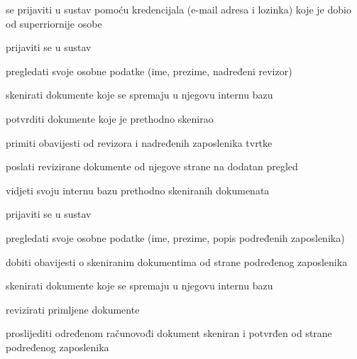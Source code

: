 			
			\begin{packed_enum}
				
				\item  {}
				\begin{packed_enum}
					
					\item se prijaviti u sustav pomoću kredencijala (e-mail adresa i lozinka) koje je dobio od superriornije osobe 
					
				\end{packed_enum}
			
				\item  {}
				\begin{packed_enum}
					
					\item prijaviti se u sustav
					\item pregledati svoje osobne podatke (ime, prezime, nadređeni revizor)
					\item skenirati dokumente koje se spremaju u njegovu internu bazu
					\item potvrditi dokumente koje je prethodno skenirao
					\item primiti obavijesti od revizora i nadređenih zaposlenika tvrtke
					\item poslati revizirane dokumente od njegove strane na dodatan pregled
					\item vidjeti svoju internu bazu prethodno skeniranih dokumenata
					
				\end{packed_enum}
				
				\item  {}
				\begin{packed_enum}
					
					\item prijaviti se u sustav
					\item pregledati svoje osobne podatke (ime, prezime, popis podređenih zaposlenika)
					\item dobiti obavijesti o skeniranim dokumentima od strane podređenog zaposlenika
					\item skenirati dokumente koje se spremaju u njegovu internu bazu
					\item revizirati primljene dokumente
					\item proslijediti određenom računovođi dokument skeniran i potvrđen od strane podređenog zaposlenika
					

\end{packed_enum}
\end{packed_enum}
